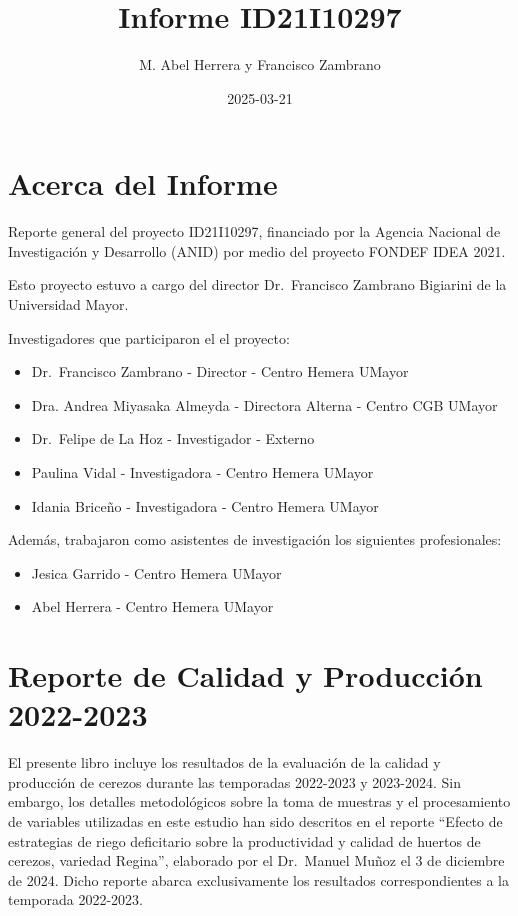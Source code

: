 \documentclass[
  letterpaper,
  DIV=11,
  numbers=noendperiod]{scrreprt}
\title{Informe ID21I10297}
\author{M. Abel Herrera y Francisco Zambrano}
\date{2025-03-21}
\providecommand{\tightlist}{%
  \setlength{\itemsep}{0pt}\setlength{\parskip}{0pt}}\usepackage{longtable,booktabs,array}
\renewcommand*\contentsname{Tabla de contenidos}
\newcommand\contentsname{Tabla de contenidos}
\begin{document}
\maketitle

\renewcommand*\contentsname{Tabla de contenidos}
{
\hypersetup{linkcolor=}
\setcounter{tocdepth}{2}
\tableofcontents
}

\part{Acerca del Informe}

Reporte general del proyecto ID21I10297, financiado por la Agencia
Nacional de Investigación y Desarrollo (ANID) por medio del proyecto
FONDEF IDEA 2021.

Esto proyecto estuvo a cargo del director Dr.~Francisco Zambrano
Bigiarini de la Universidad Mayor.

Investigadores que participaron el el proyecto:

\begin{itemize}
\tightlist
\item
  Dr.~Francisco Zambrano - Director - Centro Hemera UMayor
\item
  Dra. Andrea Miyasaka Almeyda - Directora Alterna - Centro CGB UMayor
\item
  Dr.~Felipe de La Hoz - Investigador - Externo
\item
  Paulina Vidal - Investigadora - Centro Hemera UMayor
\item
  Idania Briceño - Investigadora - Centro Hemera UMayor
\end{itemize}

Además, trabajaron como asistentes de investigación los siguientes
profesionales:

\begin{itemize}
\tightlist
\item
  Jesica Garrido - Centro Hemera UMayor
\item
  Abel Herrera - Centro Hemera UMayor
\end{itemize}

\part{Reporte de Calidad y Producción 2022-2023}

El presente libro incluye los resultados de la evaluación de la calidad
y producción de cerezos durante las temporadas 2022-2023 y 2023-2024.
Sin embargo, los detalles metodológicos sobre la toma de muestras y el
procesamiento de variables utilizadas en este estudio han sido descritos
en el reporte ``Efecto de estrategias de riego deficitario sobre la
productividad y calidad de huertos de cerezos, variedad Regina'',
elaborado por el Dr.~Manuel Muñoz el 3 de diciembre de 2024. Dicho
reporte abarca exclusivamente los resultados correspondientes a la
temporada 2022-2023.
\end{document}

